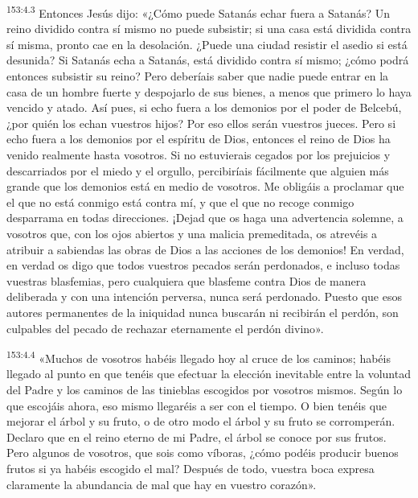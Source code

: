 \par 
\textsuperscript{153:4.3} Entonces Jesús dijo: «¿Cómo puede Satanás echar fuera a Satanás? Un reino dividido contra sí mismo no puede subsistir; si una casa está dividida contra sí misma, pronto cae en la desolación. ¿Puede una ciudad resistir el asedio si está desunida? Si Satanás echa a Satanás, está dividido contra sí mismo; ¿cómo podrá entonces subsistir su reino? Pero deberíais saber que nadie puede entrar en la casa de un hombre fuerte y despojarlo de sus bienes, a menos que primero lo haya vencido y atado. Así pues, si echo fuera a los demonios por el poder de Belcebú, ¿por quién los echan vuestros hijos? Por eso ellos serán vuestros jueces. Pero si echo fuera a los demonios por el espíritu de Dios, entonces el reino de Dios ha venido realmente hasta vosotros. Si no estuvierais cegados por los prejuicios y descarriados por el miedo y el orgullo, percibiríais fácilmente que alguien más grande que los demonios está en medio de vosotros. Me obligáis a proclamar que el que no está conmigo está contra mí, y que el que no recoge conmigo desparrama en todas direcciones. ¡Dejad que os haga una advertencia solemne, a vosotros que, con los ojos abiertos y una malicia premeditada, os atrevéis a atribuir a sabiendas las obras de Dios a las acciones de los demonios! En verdad, en verdad os digo que todos vuestros pecados serán perdonados, e incluso todas vuestras blasfemias, pero cualquiera que blasfeme contra Dios de manera deliberada y con una intención perversa, nunca será perdonado. Puesto que esos autores permanentes de la iniquidad nunca buscarán ni recibirán el perdón, son culpables del pecado de rechazar eternamente el perdón divino».

\par 
\textsuperscript{153:4.4} «Muchos de vosotros habéis llegado hoy al cruce de los caminos; habéis llegado al punto en que tenéis que efectuar la elección inevitable entre la voluntad del Padre y los caminos de las tinieblas escogidos por vosotros mismos. Según lo que escojáis ahora, eso mismo llegaréis a ser con el tiempo. O bien tenéis que mejorar el árbol y su fruto, o de otro modo el árbol y su fruto se corromperán. Declaro que en el reino eterno de mi Padre, el árbol se conoce por sus frutos. Pero algunos de vosotros, que sois como víboras, ¿cómo podéis producir buenos frutos si ya habéis escogido el mal? Después de todo, vuestra boca expresa claramente la abundancia de mal que hay en vuestro corazón».


